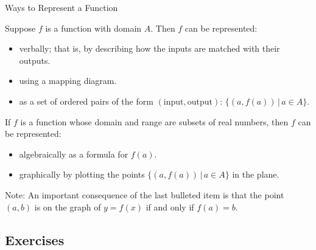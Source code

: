 \begin{floatbox}[label=waystorepresentfunctionsbox]{Ways to Represent a Function}

Suppose $f$ is a function with domain $A$.  Then $f$ can be represented:

\begin{itemize}

\item  verbally; that is, by describing how the inputs are matched with their outputs.

\item using a mapping diagram.

\item  as a set of ordered pairs of the form $(\text{input}, \text{output})$:  $\{ (a, f(a)) \, | \, a \in A \}$.

\end{itemize}

If $f$ is a function whose domain and range are subsets of real numbers, then $f$ can be represented:

\begin{itemize}

\item  algebraically as a formula for $f(a)$.

\item  graphically by plotting the points $\{ (a, f(a))  \, | \, a \in A \}$ in the plane.

\end{itemize}

Note: An important consequence of the last bulleted item is that the point $(a, b)$ is on the graph of $y = f(x)$ if and only if $f(a) = b.$\label{FundamentalGraphingPrinciple}

\end{floatbox}

\clearpage

\subsection{Exercises}


\closegraphsfile